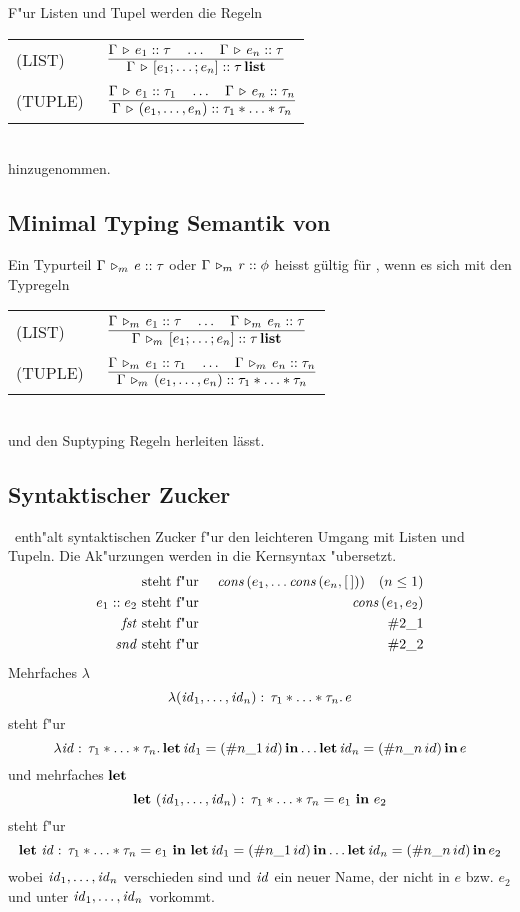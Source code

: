 F"ur Listen und Tupel werden die Regeln\\[3mm]
\begin{tabular}{ll}
  \mbox{(LIST)\ } & $\regel{\Tj{\Gamma}{e_1}{\tau} \quad \ldots \quad \Tj{\Gamma}{e_n}{\tau}}
                           {\Tj{\Gamma}{[e_1;\ldots;e_n]}{\listtype{\tau}}}$ \\[5mm]
  \mbox{(TUPLE)\ }& $\regel{\Tj{\Gamma}{e_1}{\tau_1} \quad \ldots \quad \Tj{\Gamma}{e_n}{\tau_n}}
                           {\Tj{\Gamma}{(e_1,\ldots,e_n)}{\tau_1 * \ldots * \tau_n}}$
\end{tabular}\\[7mm]
hinzugenommen.


\subsection{Minimal Typing Semantik von \LTHREE}

  Ein Typurteil $\Gamma\,\triangleright_m\,e\mathrel{::}\tau$ oder $\Gamma\,\triangleright_m\,r\mathrel{::}\phi$ heisst g\"ultig f\"ur \LTHREE,
  wenn es sich mit den  Typregeln \\[5mm]

     \begin{tabular}{ll}
  \mbox{(LIST)\ } & $\regel{\Tjm{\Gamma}{e_1}{\tau} \quad \ldots \quad \Tjm{\Gamma}{e_n}{\tau}}
                           {\Tjm{\Gamma}{[e_1;\ldots;e_n]}{\listtype{\tau}}}$ \\[5mm]
  \mbox{(TUPLE)\ }& $\regel{\Tjm{\Gamma}{e_1}{\tau_1} \quad \ldots \quad \Tjm{\Gamma}{e_n}{\tau_n}}
                           {\Tjm{\Gamma}{(e_1,\ldots,e_n)}{\tau_1 * \ldots * \tau_n}}$
  \end{tabular} \\[7mm]
  und den Suptyping Regeln herleiten l\"asst.

\subsection{Syntaktischer Zucker}

\LTHREE\ enth"alt syntaktischen Zucker f"ur den leichteren Umgang mit Listen und Tupeln. Die Ak"urzungen werden
in die Kernsyntax "ubersetzt.
\begin{eqnarray*}
  [e_1;\ldots;e_n]    & \mbox{ steht f"ur } & \Cons\,(e_1,\ldots \Cons\,(e_n, [\,])) \quad (n \le 1) \\
  e_1 \coloncolon e_2 & \mbox{ steht f"ur } & \Cons\,(e_1, e_2) \\
  \Fst                & \mbox{ steht f"ur } & \#2\_1 \\
  \Snd                & \mbox{ steht f"ur } & \#2\_2
\end{eqnarray*}
Mehrfaches $\lambda$
\[
  \lambda({\text{\it id\/}}_1,\ldots,{\text{\it id\/}}_n):\,\tau_1 * \ldots * \tau_n.\,e
\]
steht f"ur
\[
  \lambda {\text{\it id\/}}:\,\tau_1 * \ldots * \tau_n.\,\textbf{let}\,{\text{\it id\/}}_1 = (\#n\_1\,id)\,\textbf{in} \ldots \textbf{let}\,{\text{\it id\/}}_n = (\#n\_n\,id)\,\textbf{in}\,e
\]
und mehrfaches $\textbf{let}$
\[
  \textbf{let}\ ({\text{\it id\/}}_1,\ldots,{\text{\it id\/}}_n):\,\tau_1 * \ldots * \tau_n = e_1\ \textbf{in}\ e_2
\]
steht f"ur
\[
  \textbf{let}\ {\text{\it id\/}}:\,\tau_1 * \ldots * \tau_n = e_1\ \textbf{in}\ \textbf{let}\,{\text{\it id\/}}_1 = (\#n\_1\,id)\,\textbf{in} \ldots \textbf{let}\,{\text{\it id\/}}_n = (\#n\_n\,id)\,\textbf{in}\,e_2
\]
wobei ${\text{\it id\/}}_1,\ldots,{\text{\it id\/}}_n$ verschieden sind und ${\text{\it id\/}}$ ein neuer Name, der nicht in $e$ bzw. $e_2$ und unter ${\text{\it id\/}}_1,\ldots,{\text{\it id\/}}_n$
vorkommt.

